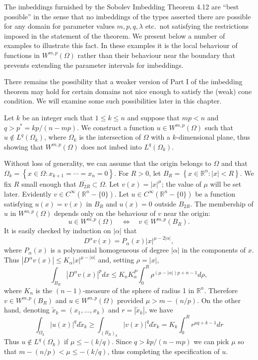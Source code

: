 \begin{para}
  The imbeddings furnished by the Sobolev Imbedding Theorem 4.12 are ``best possible'' in the sense that
  no imbeddings of the types asserted there are possible for any domain for parameter values $m, p, q, \lambda$ 
  etc.\ not satisfying the restrictions imposed in the statement of the theorem.
  We present below a number of examples to illustrate this fact.
  In these examples it is the local behaviour of functions in $W^{m,p}(\Omega)$ rather than their behaviour 
  near the boundary that prevents extending the parameter intervals for imbeddings.
  
  There remains the possibility that a weaker version of Part I of the imbedding theorem may hold for certain 
  domains not nice enough to satisfy the (weak) cone condition.
  We will examine some such possibilities later in this chapter.
\end{para}


\begin{example}
  Let $k$ be an integer such that $1 \leq k \leq n$ and suppose that $m p<n$ and $q>p^*=k p /(n-m p)$. We construct a function $u \in W^{m, p}(\Omega)$ such that $u \notin L^q\left(\Omega_k\right)$, where $\Omega_k$ is the intersection of $\Omega$ with a $k$-dimensional plane, thus showing that $W^{m,p}(\Omega)$ does not imbed into $L^q\left(\Omega_k\right)$.
  
  Without loss of generality, we can assume that the origin belongs to $\Omega$ and that $\Omega_k=\left\{x \in \Omega: x_{k+1}=\cdots=x_n=0\right\}$. For $R>0$, let $B_R=\left\{x \in \mathbb{R}^n:|x|<R\right\}$. We fix $R$ small enough that $\overline{B_{2 R}} \subset \Omega$. Let $v(x)=|x|^\mu$; the value of $\mu$ will be set later. Evidently $v \in C^{\infty}\left(\mathbb{R}^n-\{0\}\right)$. Let $u \in C^{\infty}\left(\mathbb{R}^n-\{0\}\right)$ be a function satisfying $u(x)=v(x)$ in $B_R$ and $u(x)=0$ outside $B_{2 R}$. The membership of $u$ in $W^{m,p}(\Omega)$ depends only on the behaviour of $v$ near the origin:
  \[
  u \in W^{m, p}(\Omega) \quad \Longleftrightarrow \quad v \in W^{m, p}\left(B_R\right) .
  \]
  It is easily checked by induction on $|\alpha|$ that
  \[
  D^\alpha v(x)=P_\alpha(x)|x|^{\mu-2|\alpha|},
  \]
  where $P_\alpha(x)$ is a polynomial homogeneous of degree $|\alpha|$ in the components of $x$. Thus $\left|D^\alpha v(x)\right| \leq K_\alpha|x|^{\mu-|\alpha|}$ and, setting $\rho=|x|$,
  \[
  \int_{B_R}\left|D^\alpha v(x)\right|^p d x \leq K_n K_\alpha^P \int_0^R \rho^{(\mu-|\alpha|) p+n-1} d \rho,
  \]
  where $K_n$ is the $(n-1)$-measure of the sphere of radius 1 in $\mathbb{R}^n$. Therefore $v \in W^{m, p}\left(B_R\right)$ and $u \in W^{m, p}(\Omega)$ provided $\mu>m-(n / p)$.
  On the other hand, denoting $\tilde{x}_k=\left(x_1, \ldots, x_k\right)$ and $r=\left|\tilde{x}_k\right|$, we have
  \[
  \int_{\Omega_k}|u(x)|^q d \tilde{x}_k \geq \int_{\left(B_R\right)_k}|v(x)|^q d \tilde{x}_k=K_k \int_0^R r^{\mu q+k-1} d r
  \]
  Thus $u \notin L^q\left(\Omega_k\right)$ if $\mu \leq-(k / q)$.
  Since $q>k p /(n-m p)$ we can pick $\mu$ so that $m-(n / p)<\mu \leq-(k / q)$, thus completing the specification of $u$.
\end{example}

